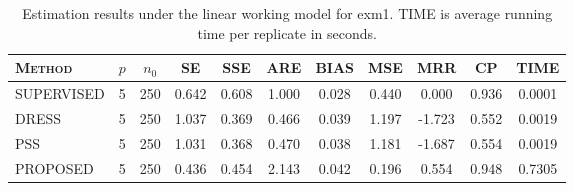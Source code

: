 \begin{table}[htbp]
\centering
\caption{Estimation results under the linear working model for exm1. TIME is average running time per replicate in seconds.}
\label{tab:linear_exm1}
\begin{tabular}{llccccccccc}
\toprule
\textsc{Method} & $p$ & $n_0$ & \textsc{SE} & \textsc{SSE} & \textsc{ARE} & \textsc{BIAS} & \textsc{MSE} & \textsc{MRR} & \textsc{CP} & \textsc{TIME} \\
\midrule
\textsc{SUPERVISED} & 5 & 250 & 0.642 & 0.608 & 1.000 & 0.028 & 0.440 & 0.000 & 0.936 & 0.0001 \\
\addlinespace[0.5em]
\textsc{DRESS} & 5 & 250 & 1.037 & 0.369 & 0.466 & 0.039 & 1.197 & -1.723 & 0.552 & 0.0019 \\
\addlinespace[0.5em]
\textsc{PSS} & 5 & 250 & 1.031 & 0.368 & 0.470 & 0.038 & 1.181 & -1.687 & 0.554 & 0.0019 \\
\addlinespace[0.5em]
\textsc{PROPOSED} & 5 & 250 & 0.436 & 0.454 & 2.143 & 0.042 & 0.196 & 0.554 & 0.948 & 0.7305 \\
\bottomrule
\end{tabular}
\end{table}
